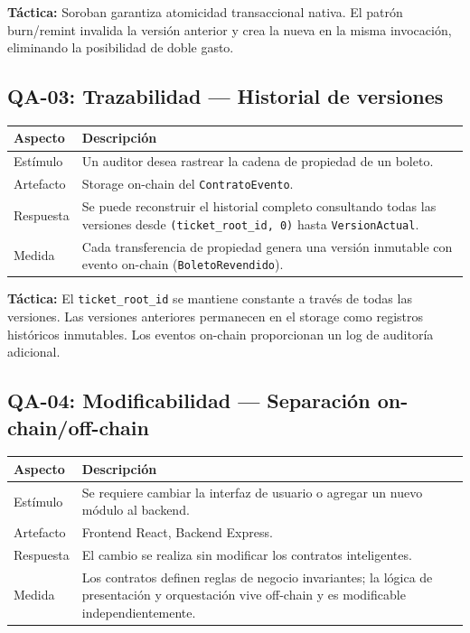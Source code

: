\documentclass[12pt,oneside]{article}
\begin{document}
\textbf{Táctica:} Soroban garantiza atomicidad transaccional nativa. El patrón burn/remint invalida la versión anterior y crea la nueva en la misma invocación, eliminando la posibilidad de doble gasto.

\subsection{QA-03: Trazabilidad — Historial de versiones}

\begin{table}[htbp]
\centering
\begin{tabularx}{\textwidth}{l X}
\toprule
\textbf{Aspecto} & \textbf{Descripción} \\
\midrule
Estímulo & Un auditor desea rastrear la cadena de propiedad de un boleto. \\
Artefacto & Storage on-chain del \texttt{ContratoEvento}. \\
Respuesta & Se puede reconstruir el historial completo consultando todas las versiones desde \texttt{(ticket\_root\_id, 0)} hasta \texttt{VersionActual}. \\
Medida & Cada transferencia de propiedad genera una versión inmutable con evento on-chain (\texttt{BoletoRevendido}). \\
\bottomrule
\end{tabularx}
\end{table}

\textbf{Táctica:} El \texttt{ticket\_root\_id} se mantiene constante a través de todas las versiones. Las versiones anteriores permanecen en el storage como registros históricos inmutables. Los eventos on-chain proporcionan un log de auditoría adicional.

\subsection{QA-04: Modificabilidad — Separación on-chain/off-chain}

\begin{table}[htbp]
\centering
\begin{tabularx}{\textwidth}{l X}
\toprule
\textbf{Aspecto} & \textbf{Descripción} \\
\midrule
Estímulo & Se requiere cambiar la interfaz de usuario o agregar un nuevo módulo al backend. \\
Artefacto & Frontend React, Backend Express. \\
Respuesta & El cambio se realiza sin modificar los contratos inteligentes. \\
Medida & Los contratos definen reglas de negocio invariantes; la lógica de presentación y orquestación vive off-chain y es modificable independientemente. \\
\bottomrule
\end{tabularx}
\end{table}
\end{document}

